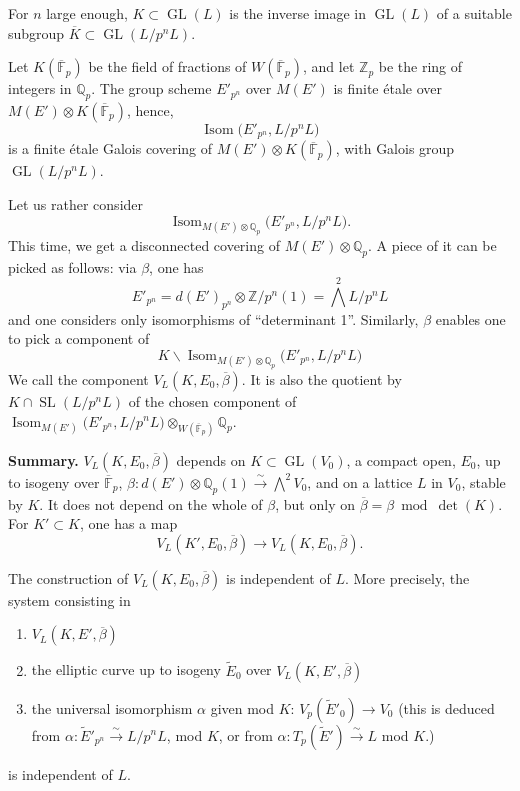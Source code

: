 \documentclass[11pt,a4paper]{article}
\theoremstyle{plain}
\theoremstyle{definition}
\theoremstyle{remark}
\DeclareMathOperator{\Isom}{Isom}
\DeclareMathOperator{\GL}{GL}
\DeclareMathOperator{\SL}{SL}
\newcommand{\Z}{\mathbb{Z}}
\newcommand{\Fpbar}{\overline{\mathbb{F}}_{p}}
\newcommand{\Zp}{\mathbb{Z}_{p}}
\newcommand{\Qp}{\mathbb{Q}_{p}}
\newcommand{\Vp}{V_{p}}
\newcommand{\Tp}{T_{p}}
\begin{document}
For $n$ large enough, $K \subset \GL(L)$ is the inverse image in $\GL(L)$ of a suitable subgroup $\overline{K} \subset \GL(L/p^{n}L)$.

Let $K(\Fpbar)$ be the field of fractions of $W(\Fpbar)$, and let $\Zp$ be the ring of integers in $\Qp$. The group scheme $E'_{p^{n}}$ over $M(E')$ is finite \'etale over $M(E') \otimes K(\Fpbar)$, hence,
\[
\Isom\bigl(E'_{p^{n}}, L/p^{n}L\bigr)
\]
is a finite \'etale Galois covering of $M(E') \otimes K(\Fpbar)$, with Galois group $\GL(L/p^{n}L)$.

Let us rather consider
\[
\Isom_{M(E') \otimes \Qp}\bigl(E'_{p^{n}}, L/p^{n}L\bigr).
\]
This time, we get a disconnected covering of $M(E') \otimes \Qp$. A piece of it can be picked as follows: via $\beta$, one has
\[
E'_{p^{n}} = d(E')_{p^{n}} \otimes \Z/p^{n}(1) = \bigwedge^{2} L/p^{n}L
\]
and one considers only isomorphisms of ``determinant 1''. Similarly, $\beta$ enables one to pick a component of
\[
K \backslash \Isom_{M(E') \otimes \Qp}\bigl(E'_{p^{n}}, L/p^{n}L\bigr)
\]
We call the component $V_{L}(K, E_{0}, \overline{\beta})$. It is also the quotient by $K \cap \SL(L/p^{n}L)$ of the chosen component of $\Isom_{M(E')} \bigl(E'_{p^{n}}, L/p^{n}L\bigr) \otimes_{W(\Fpbar)} \Qp$.

\bigskip

\noindent
\textbf{Summary.} $V_{L}(K, E_{0}, \overline{\beta})$ depends on $K \subset \GL(V_{0})$, a compact open, $E_{0}$, up to isogeny over $\Fpbar$, $\beta : d(E') \otimes \Qp(1) \xrightarrow{\sim} \bigwedge^{2} V_{0}$, and on a lattice $L$ in $V_{0}$, stable by $K$. It does not depend on the whole of $\beta$, but only on $\overline{\beta} = \beta \bmod \det(K)$. For $K' \subset K$, one has a map
\[
V_{L}(K', E_{0}, \overline{\beta}) \to V_{L}(K, E_{0}, \overline{\beta}).
\]

The construction of $V_{L}(K, E_{0}, \overline{\beta})$ is independent of $L$. More precisely, the system consisting in
\begin{enumerate}[label=(\alph*)]
\item $V_{L}(K, E', \overline{\beta})$
\item the elliptic curve up to isogeny $\widetilde{E}_{0}$ over $V_{L}(K, E', \overline{\beta})$
\item the universal isomorphism $\alpha$ given mod $K$: $\Vp(\widetilde{E}'_{0}) \to V_{0}$ (this is deduced from $\alpha : \widetilde{E}'_{p^{n}} \xrightarrow{\sim} L/p^{n}L$, mod $K$, or from $\alpha : \Tp(\widetilde{E}') \xrightarrow{\sim} L$ mod $K$.)
\end{enumerate}
is independent of $L$.
\end{document}
